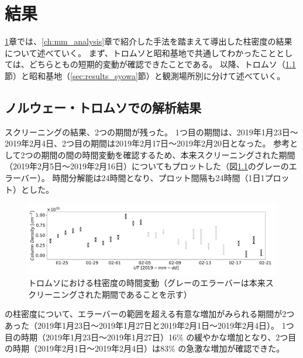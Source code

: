 \chapter{結果}
\label{ch:results}
\ref{ch:results}章では、\ref{ch:mm_analysis}章で紹介した手法を踏まえて導出した柱密度の結果について述べていく。
まず、トロムソと昭和基地で共通してわかったこととしては、どちらともの短期的変動が確認できたことである。
以降、トロムソ（\ref{sec:results_tromsoe}節）と昭和基地（\ref{sec:results_syowa}節）と観測場所別に分けて述べていく。

\section{ノルウェー・トロムソでの解析結果}
\label{sec:results_tromsoe}
スクリーニングの結果、2つの期間が残った。
1つ目の期間は、2019年1月23日〜2019年2月4日、2つ目の期間は2019年2月17日〜2019年2月20日となった。
参考として2つの期間の間の時間変動を確認するため、本来スクリーニングされた期間（2019年2月5日〜2019年2月16日）についてもプロットした（図\ref{fig:avg_ColumnDensity_tromsoe}のグレーのエラーバー）。
時間分解能は24時間となり、プロット間隔も24時間（1日1プロット）とした。
\begin{figure}[htbp]
    \centering
    \includegraphics[width=\linewidth]{master_thesis_contents/master_thesis_fig/avg_ColumnDensity_tromsoe.pdf}
    \caption{トロムソにおける柱密度の時間変動（グレーのエラーバーは本来スクリーニングされた期間であることを示す）}
    \label{fig:avg_ColumnDensity_tromsoe}
\end{figure}
の柱密度について、エラーバーの範囲を超える有意な増加がみられる期間が2つあった（2019年1月23日〜2019年1月27日と2019年2月1日〜2019年2月4日）。
1つ目の時期（2019年1月23日〜2019年1月27日）16\% の緩やかな増加となり、2つ目の時期（2019年2月1日〜2019年2月4日）は83\% の急激な増加が確認できた。


